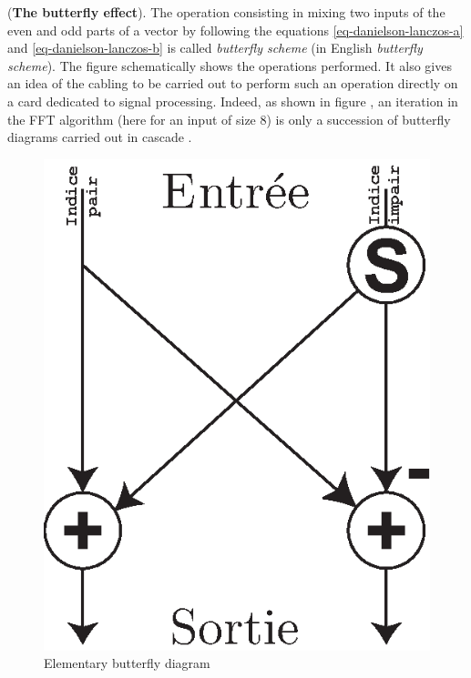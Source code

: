 \begin{rem}{(\upshape \textbf{The butterfly effect}).} 
  The operation consisting in mixing two inputs of the even and odd parts of a vector by following the equations \eqref{eq-danielson-lanczos-a} and \eqref{eq-danielson-lanczos-b} is called \textit{butterfly scheme} (in English \textit{butterfly scheme}). The figure  schematically shows the operations performed. It also gives an idea of the cabling to be carried out to perform such an operation directly on a card dedicated to signal processing. Indeed, as shown in figure , an iteration in the FFT algorithm (here for an input of size $ 8 $) is only a succession of butterfly diagrams carried out in cascade . \begin{figure}[ht]
    \begin{center}
    \includegraphics [scale = 0.7]{images/fft-butterfly-2points.eps}
    \end{center}
    \caption{Elementary butterfly diagram}

\end{figure}
\end{rem}
